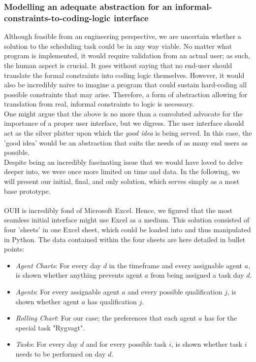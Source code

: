 \subsubsection*{Modelling an adequate abstraction for an informal-constraints-to-coding-logic interface}
Although feasible from an engineering perspective, we are uncertain whether a solution to the scheduling task could be in any way viable. No matter what program is implemented, it would require validation from an actual user; as such, the human aspect is crucial. It goes without saying that no end-user should translate the formal constraints into coding logic themselves. However, it would also be incredibly na\"ive to imagine a program that could sustain hard-coding all possible constraints that may arise. Therefore, a form of abstraction allowing for translation from real, informal constraints to logic is necessary. 
\\
One might argue that the above is no more than a convoluted advocate for the importance of a proper user interface, but we digress. The user interface should act as the silver platter upon which the \emph{good idea} is being served. In this case, the 'good idea' would be an abstraction that suits the needs of as many end users as possible.
\\
Despite being an incredibly fascinating issue that we would have loved to delve deeper into, we were once more limited on time and data. In the following, we will present our initial, final, and only solution, which serves simply as a most base prototype.
\\
\\
OUH is incredibly fond of Microsoft Excel. Hence, we figured that the most seamless initial interface might use Excel as a medium. This solution consisted of four 'sheets' in one Excel sheet, which could be loaded into and thus manipulated in Python. The data contained within the four sheets are here detailed in bullet points:
\begin{itemize}
	\item \emph{Agent Charts}: For every day \(d\) in the timeframe and every assignable agent \(a\), is shown whether anything prevents agent \(a\) from being assigned a task day \(d\).
	\item \emph{Agents}: For  every assignable agent \(a\) and every possible qualification \(j\), is shown whether agent \(a\) has qualification \(j\).
	\item \emph{Rolling Chart}: For our case; the preferences that each agent \(a\) has for the special task "Rygvagt".
	\item \emph{Tasks}: For every day \(d\) and for every possible task \(i\), is shown whether task \(i\) needs to be performed on day \(d\).
\end{itemize}
